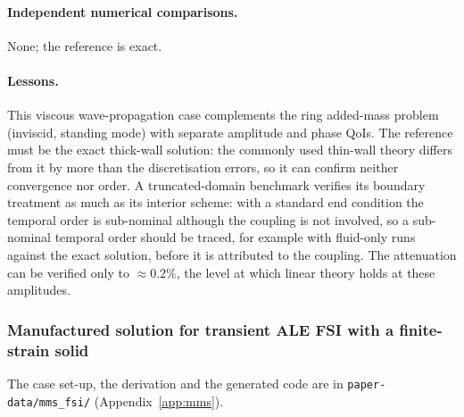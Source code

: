 
\paragraph{Independent numerical comparisons.}
None; the reference is exact.

\paragraph{Lessons.}
This viscous wave-propagation case complements the ring added-mass problem (inviscid, standing mode) with separate amplitude and phase QoIs.
The reference must be the exact thick-wall solution: the commonly used thin-wall theory differs from it by more than the discretisation errors, so it can confirm neither convergence nor order.
A truncated-domain benchmark verifies its boundary treatment as much as its interior scheme: with a standard end condition the temporal order is sub-nominal although the coupling is not involved, so a sub-nominal temporal order should be traced, for example with fluid-only runs against the exact solution, before it is attributed to the coupling.
The attenuation can be verified only to $\approx0.2\%$, the level at which linear theory holds at these amplitudes.

\subsubsection{Manufactured solution for transient ALE FSI with a finite-strain solid}\label{sec:mms_fsi}

The case set-up, the derivation and the generated code are in \texttt{paper-data/mms\_fsi/} (Appendix~\ref{app:mms}).

